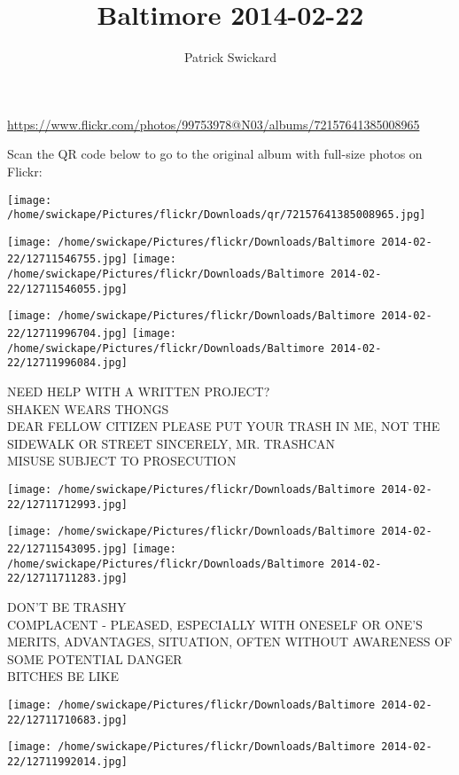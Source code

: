 \documentclass[10pt,letterpaper]{article}
\title{Baltimore 2014-02-22}
\author{Patrick Swickard}
\date{}
\begin{document}
\maketitle

\url{https://www.flickr.com/photos/99753978@N03/albums/72157641385008965}

Scan the QR code below to go to the original album with full-size photos on Flickr:

\texttt{[image: /home/swickape/Pictures/flickr/Downloads/qr/72157641385008965.jpg]}
\pagebreak

\texttt{[image: /home/swickape/Pictures/flickr/Downloads/Baltimore 2014-02-22/12711546755.jpg]}
\texttt{[image: /home/swickape/Pictures/flickr/Downloads/Baltimore 2014-02-22/12711546055.jpg]}

\texttt{[image: /home/swickape/Pictures/flickr/Downloads/Baltimore 2014-02-22/12711996704.jpg]}
\texttt{[image: /home/swickape/Pictures/flickr/Downloads/Baltimore 2014-02-22/12711996084.jpg]}

NEED HELP WITH A WRITTEN PROJECT?\\
SHAKEN WEARS THONGS\\
DEAR FELLOW CITIZEN PLEASE PUT YOUR TRASH IN ME, NOT THE SIDEWALK OR STREET SINCERELY, MR. TRASHCAN\\
MISUSE SUBJECT TO PROSECUTION
\pagebreak

\texttt{[image: /home/swickape/Pictures/flickr/Downloads/Baltimore 2014-02-22/12711712993.jpg]}

\vspace{0.25in}
\texttt{[image: /home/swickape/Pictures/flickr/Downloads/Baltimore 2014-02-22/12711543095.jpg]}
\texttt{[image: /home/swickape/Pictures/flickr/Downloads/Baltimore 2014-02-22/12711711283.jpg]}

DON'T BE TRASHY\\
COMPLACENT {-} PLEASED, ESPECIALLY WITH ONESELF OR ONE'S MERITS, ADVANTAGES, SITUATION, OFTEN WITHOUT AWARENESS OF SOME POTENTIAL DANGER\\
BITCHES BE LIKE
\pagebreak

\texttt{[image: /home/swickape/Pictures/flickr/Downloads/Baltimore 2014-02-22/12711710683.jpg]}

\vspace{0.25in}
\texttt{[image: /home/swickape/Pictures/flickr/Downloads/Baltimore 2014-02-22/12711992014.jpg]}
\end{document}
